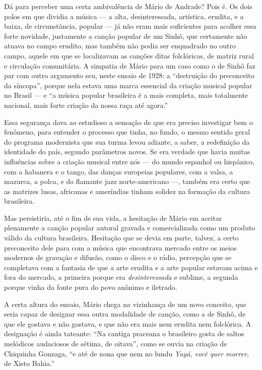 Dá para perceber uma certa ambivalência de Mário de Andrade? Pois é. Os
dois polos em que dividia a música --- a alta, desinteressada, artística,
erudita, e a baixa, de circunstância, popular --- já não eram mais
suficientes para acolher essa forte novidade, justamente a canção
popular de um Sinhô, que certamente não atuava no campo erudito, mas
também não podia ser enquadrado no outro campo, aquele em que se
localizavam as canções ditas folclóricas, de matriz rural e circulação
comunitária. A simpatia de Mário para um caso como o de Sinhô faz par
com outro argumento seu, neste ensaio de 1928: a ``destruição do
preconceito da síncopa'', porque nela estava uma marca essencial da
criação musical popular no Brasil --- e ``a música popular brasileira é a
mais completa, mais totalmente nacional, mais forte criação da nossa
raça até agora.''

Essa segurança dava ao estudioso a sensação de que era preciso
investigar bem o fenômeno, para entender o processo que tinha, no fundo,
o mesmo sentido geral do programa modernista que sua turma levou
adiante, a saber, a redefinição da identidade do país, segundo
parâmetros novos. Se era verdade que havia muitas influências sobre a
criação musical entre nós --- do mundo espanhol ou hispânico, com a
habanera e o tango, das danças europeias populares, com a valsa, a
mazurca, a polca, e do flamante jazz norte-americano ---, também era
certo que as matrizes lusas, africanas e ameríndias tinham solidez na
formação da cultura brasileira.

Mas persistiria, até o fim de sua vida, a hesitação de Mário em aceitar
plenamente a canção popular autoral gravada e comercializada como um
produto válido da cultura brasileira. Hesitação que se devia em parte,
talvez, a certo preconceito dele para com a música que encontrava
mercado entre os meios modernos de gravação e difusão, como o disco e o
rádio, percepção que se completava com a fantasia de que a arte erudita
e a arte popular estavam acima e fora do mercado, a primeira porque era
\textit{desinteressada} e sublime, a segunda porque vinha da fonte pura do
povo anônimo e iletrado.

A certa altura do ensaio, Mário chega na vizinhança de um novo conceito,
que seria capaz de designar essa outra modalidade de canção, como a de
Sinhô, de que ele gostava e não gostava, e que não era mais nem erudita
nem folclórica. A designação é ainda tateante: ``Na cantiga praceana o
brasileiro gosta de saltos melódicos audaciosos de sétima, de oitava'',
como se ouvia na criação de Chiquinha Gonzaga, ``e até de nona que nem
no lundu \textit{Yayá, você quer morrer}, de Xisto Bahia.''

